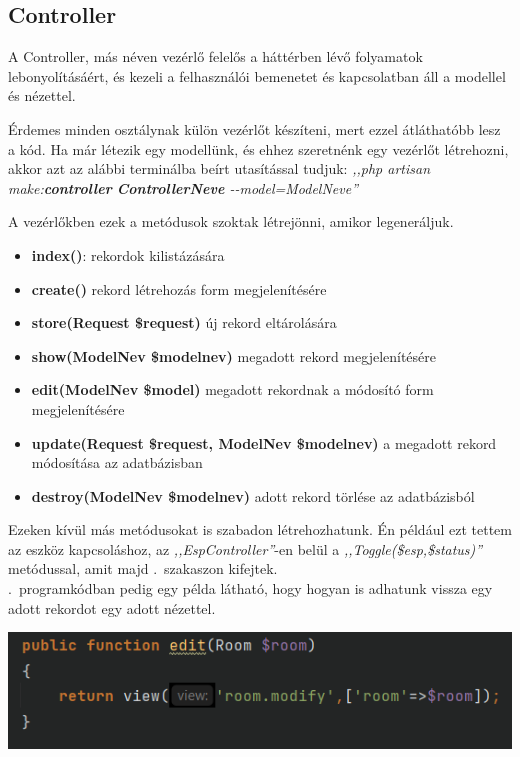 \documentclass[
]{thesis-ekf}
\theoremstyle{definition}
\theoremstyle{remark}
\begin{document}
	\subsection{Controller}
	A Controller, más néven vezérlő felelős a háttérben lévő folyamatok lebonyolításáért, és kezeli a felhasználói bemenetet és kapcsolatban áll a modellel és nézettel.
	
	Érdemes minden osztálynak külön vezérlőt készíteni, mert ezzel átláthatóbb lesz a kód. Ha már létezik egy modellünk, és ehhez szeretnénk egy vezérlőt létrehozni, akkor azt az alábbi terminálba beírt utasítással tudjuk: \emph{,,php artisan make:\textbf{controller} \textbf{ControllerNeve} \--\--model=ModelNeve''}\cite{laravel-controller}
	
	A vezérlőkben ezek a metódusok szoktak létrejönni, amikor legeneráljuk.
	\begin{itemize}
		\item \textbf{index()}: rekordok kilistázására 
		\item \textbf{create()} rekord létrehozás form megjelenítésére 
		\item \textbf{store(Request \$request)} új rekord eltárolására 
		\item \textbf{show(ModelNev \$modelnev)} megadott rekord megjelenítésére 
		\item \textbf{edit(ModelNev \$model)} megadott rekordnak a módosító form megjelenítésére
		\item \textbf{update(Request \$request, ModelNev \$modelnev)} a megadott rekord módosítása az adatbázisban
		\item \textbf{destroy(ModelNev \$modelnev)} adott rekord törlése az adatbázisból
	\end{itemize}
	Ezeken kívül más metódusokat is szabadon létrehozhatunk. Én például ezt tettem az eszköz kapcsoláshoz, az \emph{,,EspController''}-en belül a \emph{,,Toggle(\$esp,\$status)''} metódussal, amit majd .~szakaszon kifejtek.
	\\
	.~programkódban pedig egy példa látható, hogy hogyan is adhatunk vissza egy adott rekordot egy adott nézettel.\\
	\begin{minipage}{1\linewidth}
		\centering
		\label{return-room}\includegraphics[width=1\textwidth]{./src/codes/return_view}
		\label{roomcontroller-edit}
	\end{minipage}
\end{document}
